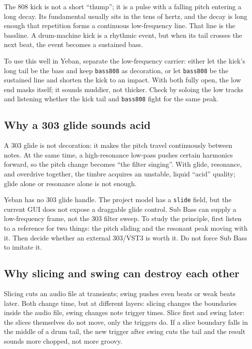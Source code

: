 The 808 kick is not a short ``thump''; it is a pulse with a falling pitch
entering a long decay. Its fundamental usually sits in the tens of hertz, and
the decay is long enough that repetition forms a continuous low-frequency
line. That line is the bassline. A drum-machine kick is a rhythmic event, but
when its tail crosses the next beat, the event becomes a sustained bass.

To use this well in Yeban, separate the low-frequency carrier: either let the
kick's long tail be the bass and keep \texttt{bass808} as decoration, or let
\texttt{bass808} be the sustained line and shorten the kick to an impact.
With both fully open, the low end masks itself; it sounds muddier, not thicker.
Check by soloing the low tracks and listening whether the kick tail and
\texttt{bass808} fight for the same peak.

\subsection{Why a 303 glide sounds acid}
\label{sec:iconic-why-303}

A 303 glide is not decoration: it makes the pitch travel continuously between
notes. At the same time, a high-resonance low-pass pushes certain harmonics
forward, so the pitch change becomes ``the filter singing''. With glide,
resonance, and overdrive together, the timbre acquires an unstable, liquid
``acid'' quality; glide alone or resonance alone is not enough.

Yeban has no 303 glide handle. The project model has a \texttt{slide} field,
but the current GUI does not expose a draggable glide control. Sub Bass can
supply a low-frequency frame, not the 303 filter sweep. To study the principle,
first listen to a reference for two things: the pitch sliding and the resonant
peak moving with it. Then decide whether an external 303/VST3 is worth it. Do
not force Sub Bass to imitate it.

\subsection{Why slicing and swing can destroy each other}
\label{sec:iconic-why-slicing}

Slicing cuts an audio file at transients; swing pushes even beats or weak
beats later. Both change time, but at different layers: slicing changes the
boundaries inside the audio file, swing changes note trigger times. Slice
first and swing later: the slices themselves do not move, only the triggers
do. If a slice boundary falls in the middle of a drum tail, the new trigger
after swing cuts the tail and the result sounds more chopped, not more
groovy.

